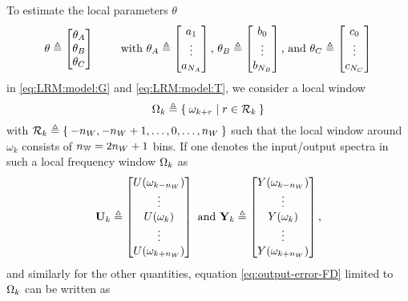 To estimate the local parameters $\theta$  
\begin{equation}
\theta \isdef 
  \begin{bmatrix}
  \theta_A\\ 
  \theta_B\\
  \theta_C
  \end{bmatrix}
\qquad \text{ with }
\theta_A \isdef
\begin{bmatrix}
a_1\\ \vdots\\ a_{\order{A}}
\end{bmatrix}
\text{, }
\theta_B \isdef
\begin{bmatrix}
b_0\\ \vdots\\ b_{\order{B}}
\end{bmatrix}
\text{, and }
\theta_C \isdef
\begin{bmatrix}
c_0\\ \vdots\\ c_{\order{C}}
\end{bmatrix}
\end{equation}
in \eqref{eq:LRM:model:G} and \eqref{eq:LRM:model:T}, we consider a local window
\begin{equation}
  \LocalWindow[k] 
  \isdef
  \Set{
    \omega_{k+r} 
    | 
    r \in \LocalShifts{k}
  }
\end{equation}
with $\LocalShifts{k} \isdef \Set{-\numel{W}, -\numel{W}+1, \ldots, 0, \ldots, \numel{W}}$
such that the local window around $\omega_k$ consists of $\nWind = 2 \numel{W} + 1$ bins. 
If one denotes the input/output spectra in such a local frequency window $\LocalWindow[k]$ as
\begin{equation}
  \LocalVector{U}_k \isdef 
  \mat{
    U(\omega_{k-\numel{W}})\\
    \vdots\\
    U(\omega_{k})\\
    \vdots\\
    U(\omega_{k+\numel{W}})\\
  }
  \text{ and }
  \LocalVector{Y}_k \isdef 
  \mat{
    Y(\omega_{k-\numel{W}})\\
    \vdots\\
    Y(\omega_{k})\\
    \vdots\\
    Y(\omega_{k+\numel{W}})\\
  }
  \text{,}
\end{equation}
and similarly for the other quantities, equation \eqref{eq:output-error-FD} limited to $\LocalWindow[k]$ can be written as
